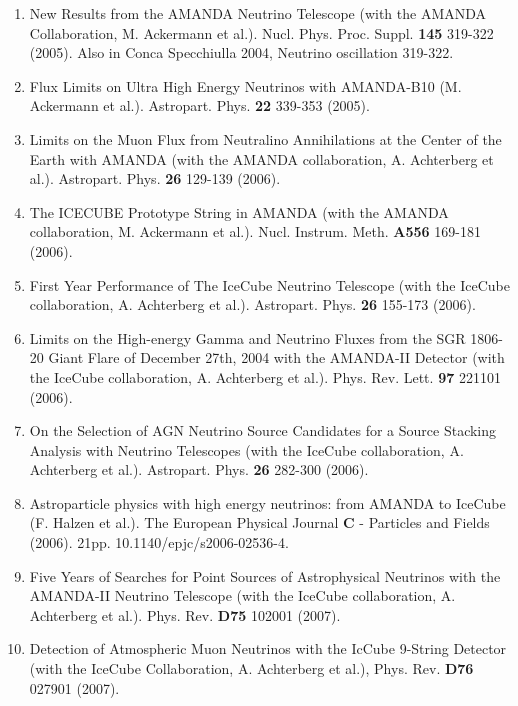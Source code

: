 \begin{enumerate}
\item New Results from the AMANDA Neutrino Telescope (with the AMANDA
  Collaboration, M. Ackermann et al.).  Nucl. Phys. Proc. Suppl. {\bf
    145} 319-322 (2005). Also in Conca Specchiulla 2004, Neutrino
  oscillation 319-322.

\item Flux Limits on Ultra High Energy Neutrinos with AMANDA-B10
  (M. Ackermann et al.).  Astropart. Phys. {\bf 22} 339-353 (2005).

\item Limits on the Muon Flux from Neutralino Annihilations at the
  Center of the Earth with AMANDA (with the AMANDA collaboration,
  A. Achterberg et al.).  Astropart. Phys. {\bf 26} 129-139 (2006).

\item The ICECUBE Prototype String in AMANDA (with the AMANDA
  collaboration, M. Ackermann et al.).  Nucl. Instrum. Meth. {\bf
    A556} 169-181 (2006).

\item First Year Performance of The IceCube Neutrino Telescope (with
  the IceCube collaboration, A. Achterberg et al.).
  Astropart. Phys. {\bf 26} 155-173 (2006).

\item Limits on the High-energy Gamma and Neutrino Fluxes from the SGR
  1806-20 Giant Flare of December 27th, 2004 with the AMANDA-II
  Detector (with the IceCube collaboration, A. Achterberg et al.).
  Phys. Rev. Lett. {\bf 97} 221101 (2006).

\item On the Selection of AGN Neutrino Source Candidates for a Source
  Stacking Analysis with Neutrino Telescopes (with the IceCube
  collaboration, A. Achterberg et al.).  Astropart. Phys. {\bf 26}
  282-300 (2006).

\item Astroparticle physics with high energy neutrinos: from AMANDA to
  IceCube (F. Halzen et al.).  The European Physical Journal {\bf C} -
  Particles and Fields (2006).  21pp.  10.1140/epjc/s2006-02536-4.

\item Five Years of Searches for Point Sources of Astrophysical
  Neutrinos with the AMANDA-II Neutrino Telescope (with the IceCube
  collaboration, A. Achterberg et al.).  Phys. Rev. {\bf D75} 102001
  (2007).

\item Detection of Atmospheric Muon Neutrinos with the IcCube 9-String
  Detector (with the IceCube Collaboration, A.  Achterberg et al.),
  Phys. Rev. {\bf D76} 027901 (2007).


\end{enumerate}
